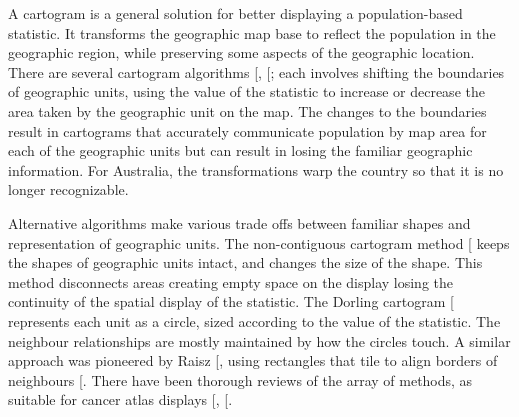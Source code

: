 \documentclass[
]{article}
\begin{document}
A cartogram is a general solution for better displaying a
population-based statistic. It transforms the geographic map base to
reflect the population in the geographic region, while preserving some
aspects of the geographic location. There are several cartogram
algorithms {[}\citeproc{ref-ACTUC}{7}{]},
{[}\citeproc{ref-CBATCC}{6}{]}; each involves shifting the boundaries of
geographic units, using the value of the statistic to increase or
decrease the area taken by the geographic unit on the map. The changes
to the boundaries result in cartograms that accurately communicate
population by map area for each of the geographic units but can result
in losing the familiar geographic information. For Australia, the
transformations warp the country so that it is no longer recognizable.

Alternative algorithms make various trade offs between familiar shapes
and representation of geographic units. The non-contiguous cartogram
method {[}\citeproc{ref-NAC}{8}{]} keeps the shapes of geographic units
intact, and changes the size of the shape. This method disconnects areas
creating empty space on the display losing the continuity of the spatial
display of the statistic. The Dorling cartogram
{[}\citeproc{ref-ACTUC}{7}{]} represents each unit as a circle, sized
according to the value of the statistic. The neighbour relationships are
mostly maintained by how the circles touch. A similar approach was
pioneered by Raisz {[}\citeproc{ref-RSCW}{9}{]}, using rectangles that
tile to align borders of neighbours {[}\citeproc{ref-CDWCS}{10}{]}.
There have been thorough reviews of the array of methods, as suitable
for cancer atlas displays {[}\citeproc{ref-review}{11}{]},
{[}\citeproc{ref-BCM}{5}{]}.
\end{document}
